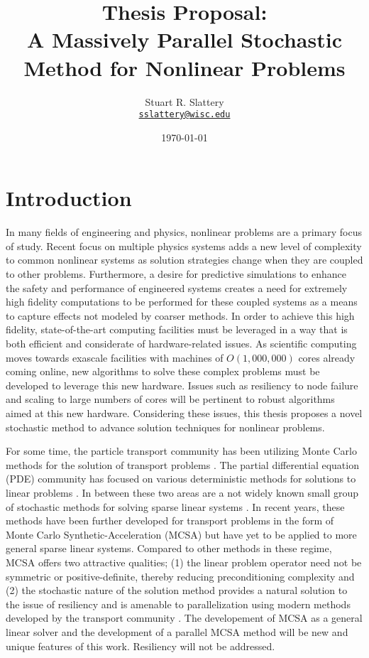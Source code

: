 \documentclass[letterpaper,12pt]{article}
\author{Stuart R. Slattery
\\ \href{mailto:sslattery@wisc.edu}{\texttt{sslattery@wisc.edu}}
}
\date{\today}
\title{Thesis Proposal:\\
  A Massively Parallel Stochastic Method for Nonlinear Problems}
\begin{document}
\maketitle

\section{Introduction}
In many fields of engineering and physics, nonlinear problems are a
primary focus of study. Recent focus on multiple physics systems adds
a new level of complexity to common nonlinear systems as solution
strategies change when they are coupled to other
problems. Furthermore, a desire for predictive simulations to enhance
the safety and performance of engineered systems creates a need for
extremely high fidelity computations to be performed for these coupled
systems as a means to capture effects not modeled by coarser
methods. In order to achieve this high fidelity, state-of-the-art
computing facilities must be leveraged in a way that is both efficient
and considerate of hardware-related issues. As scientific computing
moves towards exascale facilities with machines of $O(1,000,000)$
cores already coming online, new algorithms to solve these complex
problems must be developed to leverage this new hardware. Issues such
as resiliency to node failure and scaling to large numbers of cores
will be pertinent to robust algorithms aimed at this new
hardware. Considering these issues, this thesis proposes a novel
stochastic method to advance solution techniques for nonlinear
problems.

For some time, the particle transport community has been utilizing
Monte Carlo methods for the solution of transport problems
\cite{Lewis_1993}. The partial differential equation (PDE) community
has focused on various deterministic methods for solutions to linear
problems \cite{Saad_2003}. In between these two areas are a not widely
known small group of stochastic methods for solving sparse linear
systems \cite{Hammersley_1964, Halton_1962, Halton_1994}. In recent
years, these methods have been further developed for transport
problems in the form of Monte Carlo Synthetic-Acceleration (MCSA)
\cite{Evans_2003, Evans_2009} but have yet to be applied to more
general sparse linear systems. Compared to other methods in these
regime, MCSA offers two attractive qualities; (1) the linear problem
operator need not be symmetric or positive-definite, thereby reducing
preconditioning complexity and (2) the stochastic nature of the
solution method provides a natural solution to the issue of resiliency
and is amenable to parallelization using modern methods developed by
the transport community \cite{Wagner_2011}. The developement of MCSA
as a general linear solver and the development of a parallel MCSA
method will be new and unique features of this work. Resiliency will
not be addressed.
\end{document}
